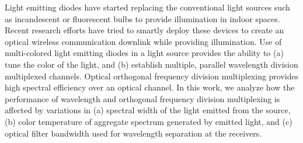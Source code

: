 Light emitting diodes have started replacing the conventional light sources such as incandescent or fluorescent bulbs to provide illumination in indoor spaces. Recent research efforts have tried to smartly deploy these devices to create an optical wireless communication downlink while providing illumination. Use of multi-colored light emitting diodes in a light source provides the ability to (a) tune the color of the light, and (b) establish multiple, parallel wavelength division multiplexed channels. Optical orthogonal frequency division multiplexing provides high spectral efficiency over an optical channel. In this work, we analyze how the performance of wavelength and orthogonal frequency division multiplexing is affected by variations in (a) spectral width of the light emitted from the source, (b) color temperature of aggregate spectrum generated by emitted light, and (c) optical filter bandwidth used for wavelength separation at the receivers. 